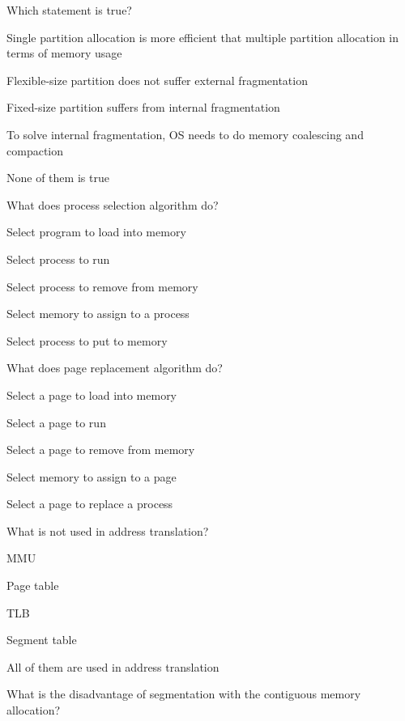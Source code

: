 \begin{questions}\setlength{\itemsep}{0.08cm}\setcounter{question}{17}
\question Which statement is true?
\begin{verticalchoices}
\item Single partition allocation is more efficient that multiple partition allocation in terms of memory usage
\item Flexible-size partition does not suffer external fragmentation
\item Fixed-size partition suffers from internal fragmentation
\item To solve internal fragmentation, OS needs to do memory coalescing and compaction
\item None of them is true
\end{verticalchoices}
\question What does process selection algorithm do?
\begin{verticalchoices}
\item Select program to load into memory
\item Select process to run
\item Select process to remove from memory
\item Select memory to assign to a process
\item Select process to put to memory
\end{verticalchoices}
\question What does page replacement algorithm do?
\begin{verticalchoices}
\item Select a page to load into memory
\item Select a page to run
\item Select a page to remove from memory
\item Select memory to assign to a page
\item Select a page to replace a process
\end{verticalchoices}
\question What is not used in address translation?
\begin{verticalchoices}
\item MMU
\item Page table
\item TLB
\item Segment table
\item All of them are used in address translation
\end{verticalchoices}
\question What is the disadvantage of segmentation with the contiguous memory allocation?
\begin{verticalchoices}

\end{verticalchoices}
\end{questions}
